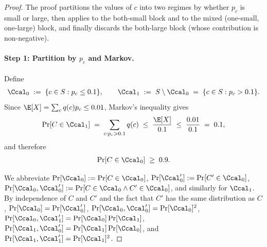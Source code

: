 \begin{proof}
The proof partitions the values of $c$ into two regimes by whether $p_c$ is
small or large, then applies  to the both-small block and
 to the mixed (one-small, one-large) block, and finally
discards the both-large block (whose contribution is non-negative).

\paragraph{Step 1: Partition by $p_c$ and Markov.}
Define
\begin{align*}
\Ccal_0 \;:=\; \{ c \in S : p_c \le 0.1 \}, \qquad
\Ccal_1 \;:=\; S \setminus \Ccal_0 \;=\; \{ c \in S : p_c > 0.1 \}.
\end{align*}
Since $\E[X] = \sum_c q(c) p_c \le 0.01$, Markov's inequality gives
\begin{align}\label{eq:markov}
\Pr[C \in \Ccal_1] \;=\; \sum_{c : p_c > 0.1} q(c)
\;\le\; \frac{\E[X]}{0.1} \;\le\; \frac{0.01}{0.1} \;=\; 0.1,
\end{align}
and therefore
\begin{align}\label{eq:c0-mass}
\Pr[C \in \Ccal_0] \;\ge\; 0.9.
\end{align}

We abbreviate $\Pr[\Ccal_0] := \Pr[C \in \Ccal_0]$,
$\Pr[\Ccal_0'] := \Pr[C' \in \Ccal_0]$,
$\Pr[\Ccal_0, \Ccal_0'] := \Pr[C \in \Ccal_0 \wedge C' \in \Ccal_0]$,
and similarly for $\Ccal_1$. By independence of $C$ and $C'$ and the fact
that $C'$ has the same distribution as $C$,
$\Pr[\Ccal_0] = \Pr[\Ccal_0']$,
$\Pr[\Ccal_0, \Ccal_0'] = \Pr[\Ccal_0]^2$,
$\Pr[\Ccal_0, \Ccal_1'] = \Pr[\Ccal_0] \Pr[\Ccal_1]$,
$\Pr[\Ccal_1, \Ccal_0'] = \Pr[\Ccal_1] \Pr[\Ccal_0]$,
and $\Pr[\Ccal_1, \Ccal_1'] = \Pr[\Ccal_1]^2$.


\end{proof}
